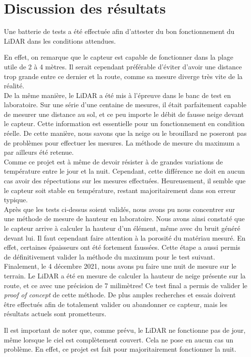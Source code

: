 \section{Discussion des résultats}

Une batterie de tests a été effectuée afin d'attester du bon fonctionnement du LiDAR dans les conditions
attendues.\par
En effet, on remarque que le capteur est capable de fonctionner dans la plage utile de 2 à 
4 mètres. Il serait cependant préférable d'éviter d'avoir une distance trop grande entre ce dernier et 
la route, comme sa mesure diverge très vite de la réalité. \\
De la même manière, le LiDAR a été mis à l'épreuve dans le banc de test en laboratoire. Sur une série 
d'une centaine de mesures, il était parfaitement capable de mesurer une distance au sol, et ce peu importe 
le débit de fausse neige devant le capteur. Cette information est essentielle pour un fonctionnement en
condition réelle. De cette manière, nous savons que la neige ou le brouillard ne poseront pas de problèmes 
pour effectuer les mesures. La méthode de mesure du maximum a par ailleurs été retenue.\\
Comme ce projet est à même de devoir résister à de grandes variations de température entre le jour et
la nuit. Cependant, cette différence ne doit en aucun cas avoir des répectutions sur les mesures effectuées.
Heureusement, il semble que le capteur soit stable en température, restant majoritairement dans son 
erreur typique.\\
Après que les tests ci-dessus soient validés, nous avons pu nous concentrer sur une méthode de mesure de 
hauteur en laboratoire. Nous avons ainsi constaté que le capteur arrive à calculer la hauteur d'un élément,
même avec du bruit généré devant lui. Il faut cependant faire attention à la porosité du matériau mesuré. En
effet, certaines épaisseurs ont été fortement faussées. Cette étape a aussi permis de définitivement valider
la méthode du maximum pour le test suivant.\\
Finalement, le 4 décembre 2021, nous avons pu faire une nuit de mesure sur le terrain. Le LiDAR a été en
mesure de calculer la hauteur de neige présente sur la route, et ce avec une
précision de 7 milimètres! Ce test final a permis de valider le \emph{proof of concept} de cette méthode. De plus amples
recherches et essais doivent être effectués afin de totalement valider ou abandonner ce capteur, mais les
résultats actuels sont prometteurs.\par 
Il est important de noter que, comme prévu, le LiDAR ne fonctionne pas de jour, même lorsque le ciel
est complètement couvert. Cela ne pose en aucun cas un problème. En effet, ce projet est fait pour 
majoritairement fonctionner la nuit.

